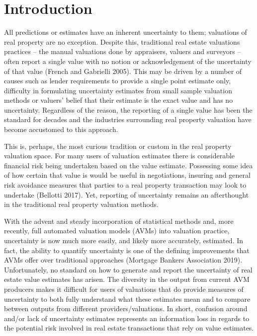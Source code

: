 \documentclass[colTwo]{anon}
\theoremstyle{definition}
\begin{document}
\section{Introduction}
All predictions or estimates have an inherent uncertainty to them; valuations of real property are no exception. Despite this, traditional real estate valuations practices -- the manual valuations done by appraisers, valuers and surveyors -- often report a single value with no notion or acknowledgement of the uncertainty of that value (French and Gabrielli 2005).  This may be driven by a number of causes such as lender requirements to provide a single point estimate only, difficulty in formulating uncertainty estimates from small sample valuation methods or valuers' belief that their estimate is the exact value and has no uncertainty.  Regardless of the reason, the reporting of a single value has been the standard for decades and the industries surrounding real property valuation have become accustomed to this approach.  

This is, perhaps, the most curious tradition or custom in the real property valuation space.  For many users of valuation estimates there is considerable financial risk being undertaken based on the value estimate.  Possessing some idea of how certain that value is would be useful in negotiations, insuring and general risk avoidance measures that parties to a real property transaction may look to undertake (Bellotti 2017).  Yet, reporting of uncertainty remains an afterthought in the traditional real property valuation methods.  

With the advent and steady incorporation of statistical methods and, more recently, full automated valuation models (AVMs) into valuation practice, uncertainty is now much more easily, and likely more accurately, estimated. In fact, the ability to quantify uncertainty is one of the defining improvements that AVMs offer over traditional approaches (Mortgage Bankers Association 2019). Unfortunately, no standard on how to generate and report the uncertainty of real estate value estimates has arisen.  The diversity in the output from current AVM producers makes it difficult for users of valuations that do provide measures of uncertainty to both fully understand what these estimates mean and to compare between outputs from different providers/valuations.  In short, confusion around and/or lack of uncertainty estimates represents an information loss in regards to the potential risk involved in real estate transactions that rely on value estimates.      
\end{document}
